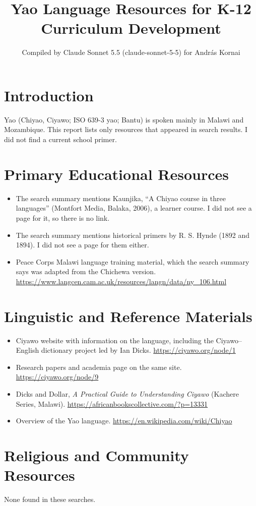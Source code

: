 \documentclass[12pt]{article}
\title{Yao Language Resources for K-12 Curriculum Development}
\author{Compiled by Claude Sonnet 5.5 (claude-sonnet-5-5) for Andr\'as Kornai}
\date{}
\begin{document}
\maketitle

\section{Introduction}
Yao (Chiyao, Ciyawo; ISO 639-3 yao; Bantu) is spoken mainly in Malawi and Mozambique. This report lists only resources that appeared in search results. I did not find a current school primer.

\section{Primary Educational Resources}
\begin{itemize}
\item The search summary mentions Kaunjika, ``A Chiyao course in three languages'' (Montfort Media, Balaka, 2006), a learner course. I did not see a page for it, so there is no link.
\item The search summary mentions historical primers by R. S. Hynde (1892 and 1894). I did not see a page for them either.
\item Peace Corps Malawi language training material, which the search summary says was adapted from the Chichewa version. \url{https://www.langcen.cam.ac.uk/resources/langn/data/ny_106.html}
\end{itemize}

\section{Linguistic and Reference Materials}
\begin{itemize}
\item Ciyawo website with information on the language, including the Ciyawo--English dictionary project led by Ian Dicks. \url{https://ciyawo.org/node/1}
\item Research papers and academia page on the same site. \url{https://ciyawo.org/node/9}
\item Dicks and Dollar, \emph{A Practical Guide to Understanding Ciyawo} (Kachere Series, Malawi). \url{https://africanbookscollective.com/?p=13331}
\item Overview of the Yao language. \url{https://en.wikipedia.com/wiki/Chiyao}
\end{itemize}

\section{Religious and Community Resources}
None found in these searches.
\end{document}
